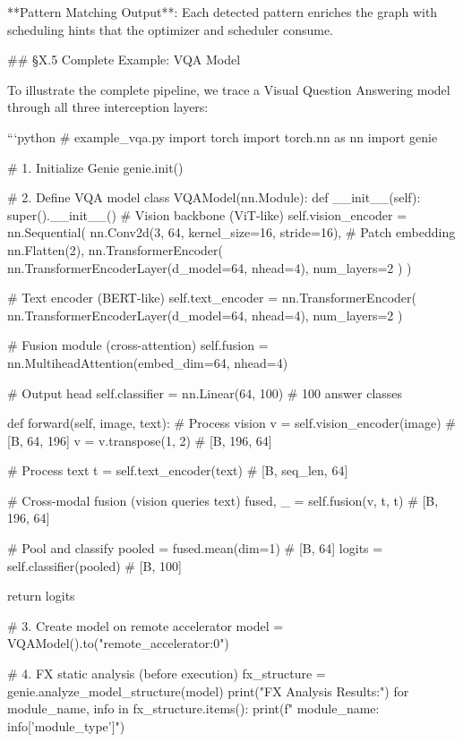 **Pattern Matching Output**: Each detected pattern enriches the graph with scheduling hints that the optimizer and scheduler consume.

## §X.5 Complete Example: VQA Model

To illustrate the complete pipeline, we trace a Visual Question Answering model through all three interception layers:

```python
# example_vqa.py
import torch
import torch.nn as nn
import genie

# 1. Initialize Genie
genie.init()

# 2. Define VQA model
class VQAModel(nn.Module):
    def __init__(self):
        super().__init__()
        # Vision backbone (ViT-like)
        self.vision_encoder = nn.Sequential(
            nn.Conv2d(3, 64, kernel_size=16, stride=16),  # Patch embedding
            nn.Flatten(2),
            nn.TransformerEncoder(
                nn.TransformerEncoderLayer(d_model=64, nhead=4),
                num_layers=2
            )
        )
        
        # Text encoder (BERT-like)
        self.text_encoder = nn.TransformerEncoder(
            nn.TransformerEncoderLayer(d_model=64, nhead=4),
            num_layers=2
        )
        
        # Fusion module (cross-attention)
        self.fusion = nn.MultiheadAttention(embed_dim=64, nhead=4)
        
        # Output head
        self.classifier = nn.Linear(64, 100)  # 100 answer classes
    
    def forward(self, image, text):
        # Process vision
        v = self.vision_encoder(image)  # [B, 64, 196]
        v = v.transpose(1, 2)  # [B, 196, 64]
        
        # Process text  
        t = self.text_encoder(text)  # [B, seq_len, 64]
        
        # Cross-modal fusion (vision queries text)
        fused, _ = self.fusion(v, t, t)  # [B, 196, 64]
        
        # Pool and classify
        pooled = fused.mean(dim=1)  # [B, 64]
        logits = self.classifier(pooled)  # [B, 100]
        
        return logits

# 3. Create model on remote accelerator
model = VQAModel().to("remote_accelerator:0")

# 4. FX static analysis (before execution)
fx_structure = genie.analyze_model_structure(model)
print("FX Analysis Results:")
for module_name, info in fx_structure.items():
    print(f"  {module_name}: {info['module_type']}")

